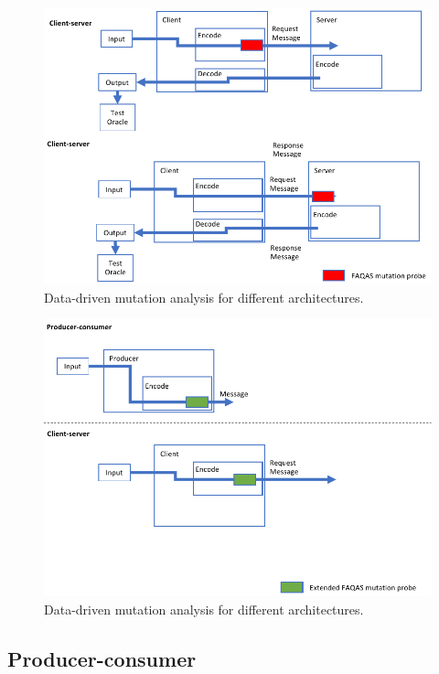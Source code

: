 \begin{figure}[h]
  \centering
    \includegraphics[width=14cm]{images/dataDrivenTestSuiteAugmentationE}
      \caption{Data-driven mutation analysis for different architectures.}
      \label{fig:dataDrivenTestSuiteAugmentationE}
\end{figure}

\begin{figure}[h]
  \centering
    \includegraphics[width=14cm]{images/dataDrivenTestSuiteAugmentationB}
      \caption{Data-driven mutation analysis for different architectures.}
      \label{fig:dataDrivenTestSuiteAugmentationB}
\end{figure}

\ENDCHANGEDWPT

\clearpage
\subsection{Producer-consumer}


